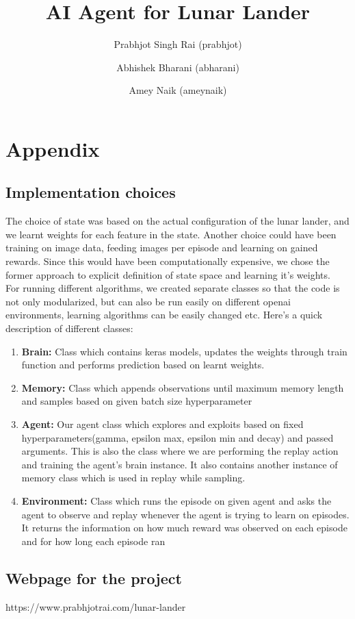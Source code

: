 \documentclass{article}
\begin{document}
\pagestyle{empty} 

\title{\textbf{ AI Agent for Lunar Lander}}

\author{Prabhjot Singh Rai  (prabhjot) \\ 
\and Abhishek Bharani (abharani) \\
\and Amey Naik (ameynaik)
}


\maketitle












\section{Appendix}
\subsection{Implementation choices}

The choice of state was based on the actual configuration of the lunar lander, and we learnt weights for each feature in the state. Another choice could have been training on image data, feeding images per episode and learning on gained rewards. Since this would have been computationally expensive, we chose the former approach to explicit definition of state space and learning it's weights. \\

For running different algorithms, we created separate classes so that the code is not only modularized, but can also be run easily on different openai environments, learning algorithms can be easily changed etc. Here's a quick description of different classes:

\begin{enumerate}
\item \textbf{Brain:} Class which contains keras models, updates the weights through train function and performs prediction based on learnt weights. 
\item \textbf{Memory:} Class which appends observations until maximum memory length and samples based on given batch size hyperparameter
\item \textbf{Agent:} Our agent class which explores and exploits based on fixed hyperparameters(gamma, epsilon max, epsilon min and decay) and passed arguments. This is also the class where we are performing the replay action and training the agent's brain instance. It also contains another instance of memory class which is used in replay while sampling.
\item \textbf{Environment:} Class which runs the episode on given agent and asks the agent to observe and replay whenever the agent is trying to learn on episodes. It returns the information on how much reward was observed on each episode and for how long each episode ran
\end{enumerate}

\subsection{Webpage for the project}

https://www.prabhjotrai.com/lunar-lander
\end{document}
